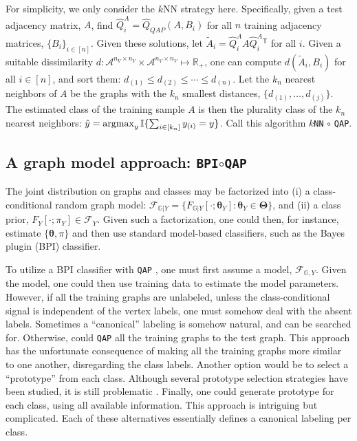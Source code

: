 \documentclass{article} %
\providecommand{\ve}[1]{\boldsymbol{#1}}
\newcommand{\argmax}{\operatornamewithlimits{argmax}}
\newcommand{\T}{^{\ensuremath{\mathsf{T}}}}           %
\newcommand{\II}{\mathbb{I}}           %
\newcommand{\bth}{\ve{\theta}}
\newcommand{\bTh}{\ve{\Theta}}
\providecommand{\mc}[1]{\mathcal{#1}}
\providecommand{\mh}[1]{\hat{#1}}
\providecommand{\mt}[1]{\widetilde{#1}}
\newcommand{\Real}{\mathbb{R}}
\newcommand{\GG}{\mathbb{G}}
\newcommand{\qap}{\texttt{QAP} }
\begin{document}
For simplicity, we only consider the $k$NN strategy here.  Specifically, given a test adjacency matrix, $A$, find $\mh{Q}_i^A=\mh{Q}_{QAP}(A,B_i)$ for all $n$ training adjacency matrices, $\{B_i\}_{i \in [n]}$.  Given these solutions, let $\mt{A}_i=\mh{Q}_i^A A {\mh{Q}_i^A}{}\T$ for all $i$. Given a suitable dissimilarity $d: \mc{A}^{n_V\times n_V} \times \mc{A}^{n_V\times n_V} \mapsto \Real_+$, one can compute $d(\mt{A}_i,B_i)$ for all $i \in [n]$, and sort them: $d_{(1)} \leq d_{(2)} \leq \cdots \leq d_{(n)}$.  Let the $k_n$ nearest neighbors of $A$ be the graphs with the $k_n$ smallest distances, $\{d_{(1)},\ldots, d_{(j)}\}$.  The estimated class of the training sample $A$ is then the plurality class of the $k_n$ nearest neighbors: $\mh{y}=\argmax_{y} \II\{\sum_{i \in [k_n]} y_{(i)} = y \}$. Call this algorithm \texttt{$k$NN} $\circ$ \texttt{QAP}.



\subsection{A graph model approach: \texttt{BPI}$\circ$\qap} %
\label{ssub:bayes_plugin_circ_qap}


The joint distribution on graphs and classes may be factorized into (i) a class-conditional random graph model: $\mc{F}_{\GG  | Y} = \{F_{\GG|Y}[\cdot; \bth_Y] : \bth_Y \in \bTh\}$, and (ii) a class prior, $F_Y[\cdot; \pi_Y] \in \mc{F}_Y$.  Given such a factorization, one could then, for instance, estimate $\{\bth,\pi\}$ and then use standard model-based classifiers, such as the Bayes plugin (BPI) classifier. 

To utilize a BPI classifier with \qap, one must first assume a model, $\mc{F}_{\GG,Y}$.  Given the model, one could then use training data to estimate the model parameters.  However, if all the training graphs are unlabeled, unless the class-conditional signal is independent of the vertex labels, one must somehow deal with the absent labels.  Sometimes a ``canonical'' labeling is somehow natural, and can be searched for.  Otherwise, could \qap all the training graphs to the test graph.  This approach has the unfortunate consequence of making all the training graphs more similar to one another, disregarding the class labels.  Another option would be to select a ``prototype'' from each class. Although several prototype selection strategies have been studied, it is still problematic \cite{Bunke2011}.  Finally, one could generate prototype for each class, using all available information.  This approach is intriguing but complicated.  Each of these alternatives essentially defines a canonical labeling per class.
\end{document}
